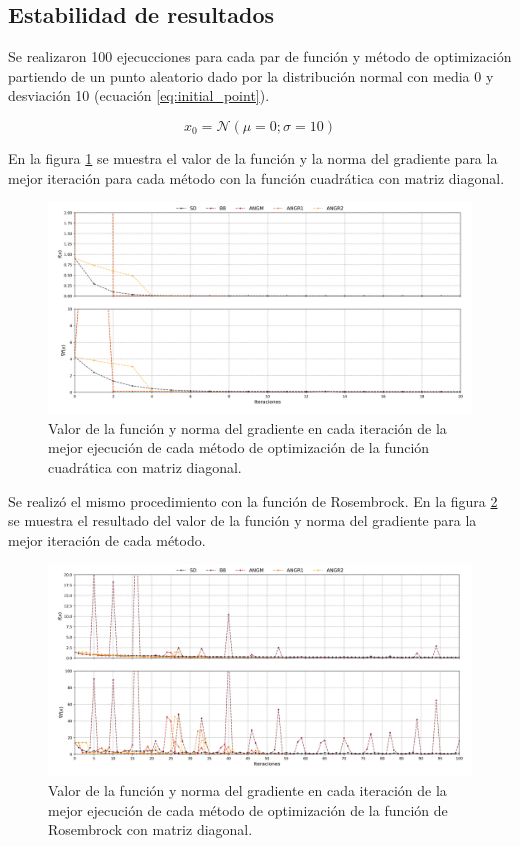 \subsection*{Estabilidad de resultados}

Se realizaron 100 ejecucciones para cada par de función y método de optimización partiendo de un punto aleatorio dado por la distribución normal con media 0 y desviación 10 (ecuación \ref{eq:initial_point}).

\begin{equation}
    x_0 =  \mathcal{N}(\mu=0;\sigma=10)
    \label{eq:initial_point}
\end{equation}

En la figura \ref{fig:quadracic_function} se muestra el valor de la función y la norma del gradiente para la mejor iteración para cada método con la función cuadrática con matriz diagonal.

\begin{figure}[H]
    \centering
    \includegraphics[width=17cm]{graphics/function/quadratic.png}
    \caption{Valor de la función y norma del gradiente en cada iteración de la mejor ejecución de cada método de optimización de la función cuadrática con matriz diagonal.}
    \label{fig:quadracic_function}
\end{figure}

Se realizó el mismo procedimiento con la función de Rosembrock. En la figura \ref{fig:rosembrock_function} se muestra el resultado del valor de la función y norma del gradiente para la mejor iteración de cada método.

\begin{figure}[H]
    \centering
    \includegraphics[width=17cm]{graphics/function/rosembrock.png}
    \caption{Valor de la función y norma del gradiente en cada iteración de la mejor ejecución de cada método de optimización de la función de Rosembrock con matriz diagonal.}
    \label{fig:rosembrock_function}
\end{figure}

